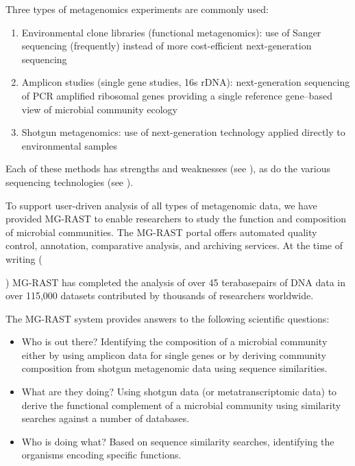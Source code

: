 \documentclass[12pt,fullpage]{report}
\begin{document}
Three types of metagenomics experiments are commonly used:

\begin{enumerate}

\item Environmental clone libraries (functional metagenomics):
use of Sanger sequencing (frequently) instead of more cost-efficient next-generation sequencing

\item Amplicon studies (single gene studies, \gls{16s} rDNA):
next-generation sequencing of PCR amplified ribosomal genes providing a single reference gene--based view of microbial community ecology

\item Shotgun metagenomics: 
use of next-generation technology applied directly to environmental samples
\end{enumerate}

\noindent
Each of these methods has strengths and weaknesses (see \cite{THOMASREVIEW}), as do the various sequencing technologies (see \cite{LOMAN}).

To support user-driven analysis of all types of metagenomic data, we have provided MG-RAST \cite{MG-RAST} to enable researchers to study the function and composition of microbial communities.
The MG-RAST portal offers automated quality control, annotation, comparative analysis, and archiving services.
At the time of writing (\date{\today}) MG-RAST has completed the analysis of over 45 terabasepairs of DNA data in over 115,000 datasets contributed by thousands of researchers worldwide.

The MG-RAST system provides answers to the following scientific questions:
\begin{itemize}
\item Who is out there?
Identifying the composition of a microbial community either by using amplicon data for single genes or by deriving community composition from shotgun metagenomic data using sequence similarities.

\item What are they doing?
Using shotgun data (or metatranscriptomic data) to derive the functional complement of a microbial community using similarity searches against a number of databases.

\item Who is doing what?
Based on sequence similarity searches, identifying the organisms encoding specific functions.
\end{itemize}
\end{document}
